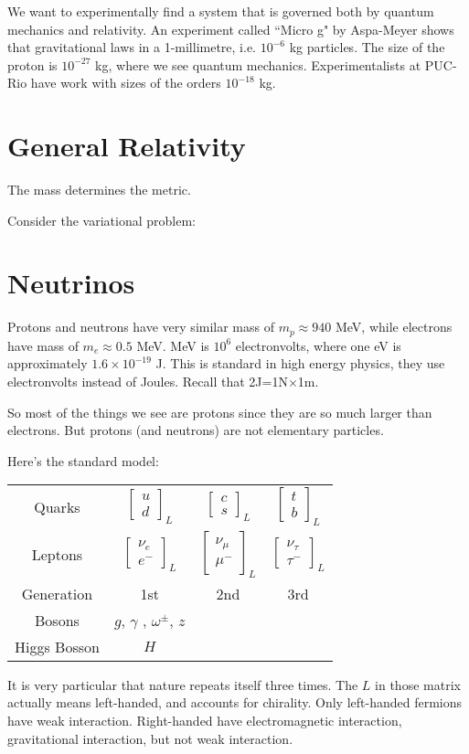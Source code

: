 We want to experimentally find a system that is governed both by quantum
mechanics and relativity. An experiment called ``Micro g" by Aspa-Meyer shows
that gravitational laws in a 1-millimetre, i.e. $10^{-6}$ kg particles. The size
of the proton is $10^{-27}$ kg, where we see quantum mechanics. Experimentalists
at PUC-Rio have work with sizes of the orders $10^{-18}$ kg.

\section{General Relativity}
\label{section-general-relativity}
\begin{slogan}
The mass determines the metric.
\end{slogan}
Consider the variational problem:

\section{Neutrinos}
\label{section-neutrinos}

Protons and neutrons have very similar mass of $m_p\approx940$ MeV, while
electrons have mass of $m_e \approx 0.5$ MeV. MeV is $10^{6}$ electronvolts,
where one eV is approximately $1.6\times 10^{-19}$ J. This is standard in high
energy physics, they use electronvolts instead of Joules. Recall that
2J=1N$\times$1m.

So most of the things we see are protons since they are so much larger than
electrons. But protons (and neutrons) are not elementary particles.

Here's the standard model:
\begin{tabular}{c c c c}
Quarks & $\begin{bmatrix} u\\d \end{bmatrix}_L $ & $\begin{bmatrix} c\\s
\end{bmatrix}_L$ & $\begin{bmatrix} t\\b \end{bmatrix}_L$\\
Leptons & $\begin{bmatrix} \nu_e\\e^- \end{bmatrix}_L $ & $\begin{bmatrix}
\nu_\mu\\ \mu^-
\end{bmatrix}_L$ & $\begin{bmatrix} \nu_\tau\\ \tau^- \end{bmatrix}_L$\\
Generation & 1st & 2nd & 3rd\\
Bosons & $g$, $\gamma$ , $\omega^\pm$, $z$ \\
Higgs Bosson & $H$
\end{tabular}
It is very particular that nature repeats itself three times. The $L$ in those
matrix actually means left-handed, and accounts for chirality. Only left-handed
fermions have weak interaction. Right-handed have electromagnetic interaction,
gravitational interaction, but not weak interaction.

